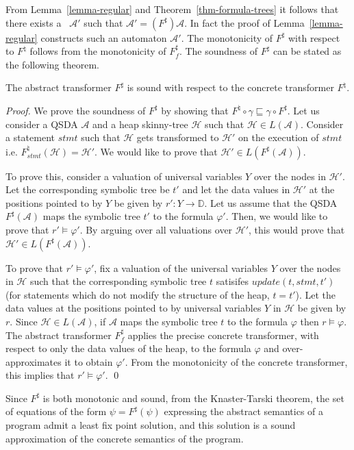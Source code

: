 \documentclass{llncs}
\newcommand{\A}{\mathcal{A}}
\newcommand{\HC}{\mathcal{H}}
\begin{document}
From Lemma~\ref{lemma-regular} and Theorem~\ref{thm-formula-trees} it follows that there exists a \QSDA\ $\mathcal{A'}$ such that $\mathcal{A'} = (F^\sharp) \mathcal{A}$. In fact the proof of Lemma~\ref{lemma-regular} constructs such an automaton $\mathcal{A'}$.
The monotonicity of $F^\sharp$ with respect to $F^\natural$ follows from the monotonicity of $F_f^\sharp$.
The soundness of $F^\sharp$ can be stated as the following theorem.

\begin{theorem}
The abstract transformer $F^\sharp$ is sound with respect to the concrete transformer $F^\natural$.
\end{theorem}
\begin{proof}
We prove the soundness of $F^\sharp$ by showing that  $F^\natural \circ \gamma \sqsubseteq \gamma \circ F^\sharp$.
Let us consider a QSDA $\A$ and a heap skinny-tree $\HC$ such that $\HC \in L(\A)$. Consider a statement $stmt$ such that $\HC$ gets transformed to $\HC'$ on the execution of $stmt$ i.e. $F^\natural_{stmt}(\HC) = \HC'$. We would like to prove that $\HC' \in L(F^\sharp(\A))$.

To prove this, consider a valuation of universal variables $Y$ over the nodes in $\HC'$. Let the corresponding symbolic tree be $t'$ and let the data values in $\HC'$ at the positions pointed to by $Y$ be given by $r': Y \rightarrow \mathbb{D}$. Let us assume that the QSDA $F^\sharp(\A)$ maps the symbolic tree $t'$ to the formula $\varphi'$. Then, we would like to prove that $r' \models \varphi'$. By arguing over all valuations over $\HC'$, this would prove that $\HC' \in L(F^\sharp(\A))$.

To prove that  $r' \models \varphi'$, fix a valuation of the universal variables $Y$ over the nodes in $\HC$ such that the corresponding symbolic tree $t$ satisifes $update(t, stmt, t')$ (for statements which do not modify the structure of the heap, $t = t'$). Let the data values at the positions pointed to by universal variables $Y$ in $\HC$ be given by $r$. Since $\HC \in L(\A)$, if $\A$ maps the symbolic tree $t$ to the formula $\varphi$ then $r \models \varphi$.
The abstract transformer $F_f^\sharp$ applies the precise concrete transformer, with respect to only the data values of the heap, to the formula $\varphi$ and over-approximates it to obtain $\varphi'$. From the monotonicity of the concrete transformer, this implies that $r' \models \varphi'$.
\qed
\end{proof}

Since $F^\sharp$ is both monotonic and sound, from the Knaster-Tarski theorem, the set of equations of the form $\psi = F^\sharp(\psi)$ expressing the abstract semantics of a program admit a least fix point solution, and this solution is a sound approximation of the concrete semantics of the program.
\end{document}
